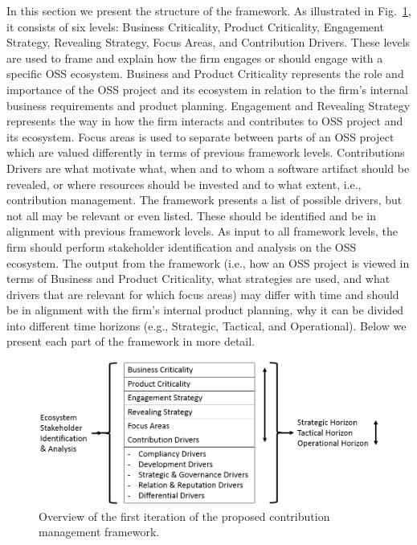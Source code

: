 \documentclass[a4paper]{llncs}
\begin{document}
In this section we present the structure of the framework. As illustrated in Fig.~\ref{fig:framework_picture}, it consists of six levels: Business Criticality, Product Criticality, Engagement Strategy, Revealing Strategy, Focus Areas, and Contribution Drivers. These levels are used to frame and explain how the firm engages or should engage with a specific OSS ecosystem. Business and Product Criticality represents the role and importance of the OSS project and its ecosystem in relation to the firm's internal business requirements and product planning. Engagement and Revealing Strategy represents the way in how the firm interacts and contributes to OSS project and its ecosystem. Focus areas is used to separate between parts of an OSS project which are valued differently in terms of previous framework levels. Contributions Drivers are what motivate what, when and to whom a software artifact should be revealed, or where resources should be invested and to what extent, i.e., contribution management. The framework presents a list of possible drivers, but not all may be relevant or even listed. These should be identified and be in alignment with previous framework levels. As input to all framework levels, the firm should perform stakeholder identification and analysis on the OSS ecosystem. The output from the framework (i.e., how an OSS project is viewed in terms of Business and Product Criticality, what strategies are used, and what drivers that are relevant for which focus areas) may differ with time and should be in alignment with the firm's internal product planning, why it can be divided into different time horizons (e.g., Strategic, Tactical, and Operational). Below we present each part of the framework in more detail.

\begin{figure}[t!]
\vspace{-0.5cm}
\centering
\includegraphics[scale=0.45]{img/framework_picture}
\caption{Overview of the first iteration of the proposed contribution management framework.}
\label{fig:framework_picture}
\vspace{-0.5cm}
\end{figure}
\end{document}
